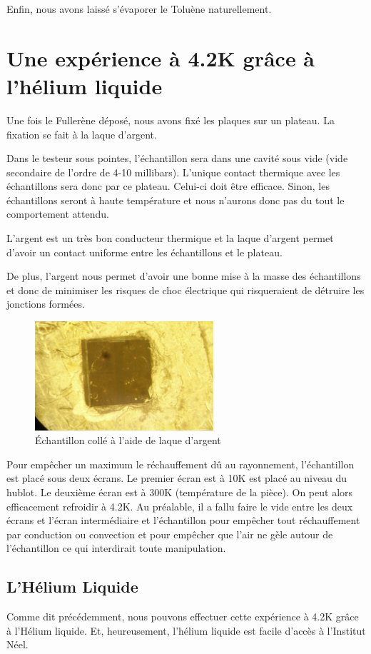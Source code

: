 Enfin, nous avons laissé s'évaporer le Toluène naturellement.
\section{Une expérience à 4.2K grâce à l'hélium liquide}
Une fois le Fullerène déposé, nous avons fixé les plaques sur un plateau. La fixation se fait à la laque d'argent.

Dans le testeur sous pointes, l'échantillon sera dans une cavité sous vide (vide secondaire de l'ordre de 4-10 millibars). L'unique contact thermique avec les échantillons sera donc par ce plateau. Celui-ci doit être efficace. Sinon, les échantillons seront à haute température et nous n'aurons donc pas du tout le comportement attendu.

L'argent est un très bon conducteur thermique et la laque d'argent permet d'avoir un contact uniforme entre les échantillons et le plateau.

De plus, l'argent nous permet d'avoir une bonne mise à la masse des échantillons et donc de minimiser les risques de choc électrique qui risqueraient de détruire les jonctions formées.
\begin{figure}[h]
    \begin{center}
        \includegraphics[width=250px]{Images/PhotoPlaqueTransistors}
        \caption{Échantillon collé à l'aide de laque d'argent}
        \label{fig:}
    \end{center}
\end{figure}

Pour empêcher un maximum le réchauffement dû au rayonnement, l'échantillon est placé sous deux écrans. Le premier écran est à 10K est placé au niveau du hublot. Le deuxième écran est à 300K (température de la pièce). On peut alors efficacement refroidir à 4.2K. Au préalable, il a fallu faire le vide entre les deux écrans et l'écran intermédiaire et l'échantillon pour empêcher tout réchauffement par conduction ou convection et pour empêcher que l'air ne gèle autour de l'échantillon ce qui interdirait toute manipulation.
\subsection{L'Hélium Liquide}
Comme dit précédemment, nous pouvons effectuer cette expérience à 4.2K grâce à l'Hélium liquide. Et, heureusement, l'hélium liquide est facile d'accès à l'Institut Néel.


